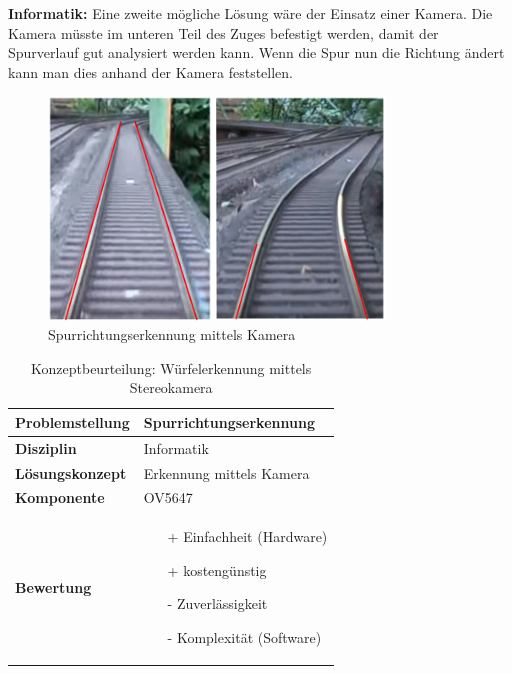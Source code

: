 \documentclass[../../main.tex]{subfiles}
\begin{document}
    \vspace{0.5cm}
    \textbf{Informatik: }
    Eine zweite mögliche Lösung wäre der Einsatz einer Kamera. Die Kamera müsste im unteren Teil des Zuges befestigt
    werden, damit der Spurverlauf gut analysiert werden kann. Wenn die Spur nun die Richtung ändert kann man dies 
    anhand der Kamera feststellen.\\

    \begin{figure}[H] %
        \centering
        \includegraphics[width=0.8\textwidth]{spurrichtung_Kamera.png}
        \caption{Spurrichtungserkennung mittels Kamera}
    \end{figure}

    \begin{flushleft}
        \begin{table}[H]
        \begin{tabular}{ | l | p{11cm} |}
        \hline
        \textbf{Problemstellung} & Spurrichtungserkennung \\ \hline
        \textbf{Disziplin} & Informatik \\ \hline
        \textbf{Lösungskonzept} & Erkennung mittels Kamera \\ \hline
        \textbf{Komponente} & OV5647 \\ \hline
        \textbf{Bewertung} &  \begin{itemize}
                                \item[+] Einfachheit (Hardware)
                                \item[+] kostengünstig
                                \item[-] Zuverlässigkeit
                                \item[-] Komplexität (Software)   
                              \end{itemize} \\ \hline
        \end{tabular}
        \caption{Konzeptbeurteilung: Würfelerkennung mittels Stereokamera}
        \label{tab:konzept_wurfel_Stereokamera}
    \end{table}
    \end{flushleft}
\end{document}
